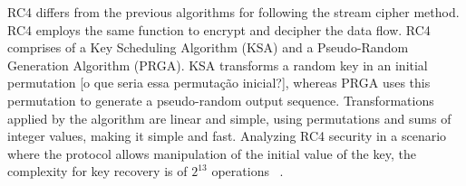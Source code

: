 RC4 differs from the previous algorithms for following the stream cipher method.  
RC4 employs the same function %
to encrypt and decipher the data flow. %
RC4 comprises of %
a Key Scheduling Algorithm (KSA) and a Pseudo-Random Generation Algorithm (PRGA). {\color{blue}KSA transforms a random key in an initial permutation [o que seria essa permutação inicial?]}, whereas PRGA %
uses this permutation to generate a pseudo-random output sequence. Transformations applied by the algorithm are linear and simple, using permutations and sums of integer values, making it simple and fast. %
Analyzing RC4 security in a scenario where the protocol allows manipulation of the initial value of the key, the complexity for key recovery is of $2^{13}$ operations%
~\cite{orumiehchiha2013cryptanalysis}.


